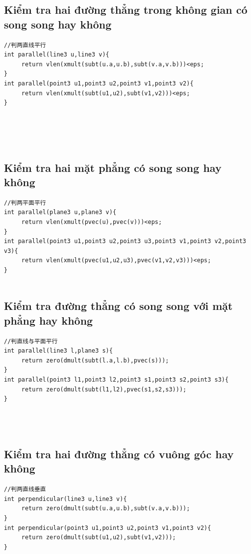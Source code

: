 \documentclass[11pt]{article}
\begin{document}
\subsection{Kiểm tra hai đường thẳng trong không gian có song song hay không}
\begingroup
\scriptsize
\begin{verbatim}
//判两直线平行
int parallel(line3 u,line3 v){
     return vlen(xmult(subt(u.a,u.b),subt(v.a,v.b)))<eps;
}
int parallel(point3 u1,point3 u2,point3 v1,point3 v2){
     return vlen(xmult(subt(u1,u2),subt(v1,v2)))<eps;
}





\end{verbatim}
\endgroup
\subsection{Kiểm tra hai mặt phẳng có song song hay không}
\begingroup
\scriptsize
\begin{verbatim}
//判两平面平行
int parallel(plane3 u,plane3 v){
     return vlen(xmult(pvec(u),pvec(v)))<eps;
}
int parallel(point3 u1,point3 u2,point3 u3,point3 v1,point3 v2,point3 v3){
     return vlen(xmult(pvec(u1,u2,u3),pvec(v1,v2,v3)))<eps;
}


\end{verbatim}
\endgroup
\subsection{Kiểm tra đường thẳng có song song với mặt phẳng hay không}
\begingroup
\scriptsize
\begin{verbatim}
//判直线与平面平行
int parallel(line3 l,plane3 s){
     return zero(dmult(subt(l.a,l.b),pvec(s)));
}
int parallel(point3 l1,point3 l2,point3 s1,point3 s2,point3 s3){
     return zero(dmult(subt(l1,l2),pvec(s1,s2,s3)));
}




\end{verbatim}
\endgroup
\subsection{Kiểm tra hai đường thẳng có vuông góc hay không}
\begingroup
\scriptsize
\begin{verbatim}
//判两直线垂直
int perpendicular(line3 u,line3 v){
     return zero(dmult(subt(u.a,u.b),subt(v.a,v.b)));
}
int perpendicular(point3 u1,point3 u2,point3 v1,point3 v2){
     return zero(dmult(subt(u1,u2),subt(v1,v2)));
}


\end{verbatim}
\endgroup
\end{document}
